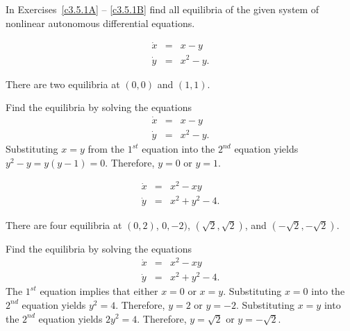 \documentclass{ximera}
\begin{document}
\EXER

\TEXER

\noindent In Exercises~\ref{c3.5.1A} -- \ref{c3.5.1B} find all equilibria of
the given system of nonlinear autonomous differential equations.
\begin{exercise}  \label{c3.5.1A}
\begin{eqnarray*}
\dot{x} & = & x - y\\
\dot{y} & = & x^2 - y.
\end{eqnarray*}

\begin{solution}
\ans There are two equilibria at $(0,0)$ and $(1,1)$.

\soln Find the equilibria by solving the equations
\begin{eqnarray*}
\dot{x} & = & x-y\\
\dot{y} & = & x^2-y.
\end{eqnarray*}
Substituting $x=y$ from the $1^{st}$ equation into the $2^{nd}$ equation
yields $y^2-y = y(y-1)=0$.  Therefore, $y=0$ or $y=1$.



\end{solution}
\end{exercise}
\begin{exercise}  \label{c3.5.1B}
\begin{eqnarray*}
\dot{x} & = & x^2 - xy\\
\dot{y} & = & x^2 + y^2 - 4.
\end{eqnarray*}

\begin{solution}
\ans There are four equilibria at $(0,2)$, $0,-2)$, 
$(\sqrt{2},\sqrt{2})$, and $(-\sqrt{2},-\sqrt{2})$.

\soln Find the equilibria by solving the equations
\begin{eqnarray*}
\dot{x} & = & x^2-xy\\
\dot{y} & = & x^2+y^2-4.
\end{eqnarray*}
The $1^{st}$ equation implies that either $x=0$ or $x=y$.  Substituting
$x=0$ into the $2^{nd}$ equation yields $y^2=4$.  Therefore, $y=2$ or $y=-2$.
Substituting $x=y$ into the $2^{nd}$ equation yields $2y^2=4$. Therefore, 
$y = \sqrt{2}$ or $y = -\sqrt{2}$.


\end{solution}
\end{exercise}
\end{document}
